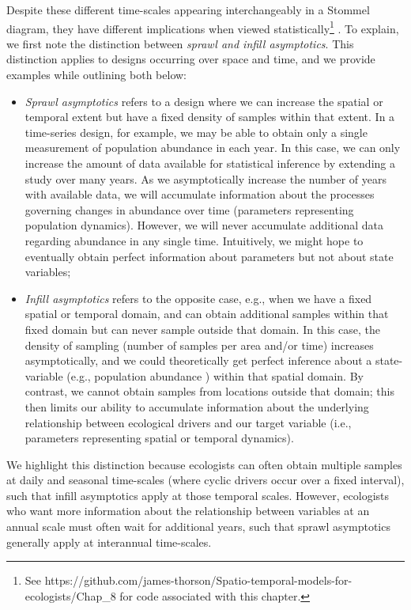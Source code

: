 Despite these different time-scales appearing interchangeably in a Stommel diagram, they have different implications when viewed statistically\footnote{See https://github.com/james-thorson/Spatio-temporal-models-for-ecologists/Chap\_8 for code associated with this chapter.} \cite{cressie_statistics_1993}.  To explain, we first note the distinction between \textit{sprawl and infill asymptotics}.  This distinction applies to designs occurring over space and time, and we provide examples while outlining both below:
\begin{itemize}
    \item \textit{Sprawl asymptotics} refers to a design where we can increase the spatial or temporal extent but have a fixed density of samples within that extent.  In a time-series design, for example, we may be able to obtain only a single measurement of population abundance in each year.  In this case, we can only increase the amount of data available for statistical inference by extending a study over many years.  As we asymptotically increase the number of years with available data, we will accumulate information about the processes governing changes in abundance over time (parameters representing population dynamics). However, we will never accumulate additional data regarding abundance in any single time.  Intuitively, we might hope to eventually obtain perfect information about parameters but not about state variables;  
    
    \item \textit{Infill asymptotics} refers to the opposite case, e.g., when we have a fixed spatial or temporal domain, and can obtain additional samples within that fixed domain but can never sample outside that domain.  In this case, the density of sampling (number of samples per area and/or time) increases asymptotically, and we could theoretically get perfect inference about a state-variable (e.g., population abundance ) within that spatial domain.  By contrast, we cannot obtain samples from locations outside that domain;  this then limits our ability to accumulate information about the underlying relationship between ecological drivers and our target variable (i.e., parameters representing spatial or temporal dynamics).
\end{itemize}
We highlight this distinction because ecologists can often obtain multiple samples at daily and seasonal time-scales (where cyclic drivers occur over a fixed interval), such that infill asymptotics apply at those temporal scales.  However, ecologists who want more information about the relationship between variables at an annual scale must often wait for additional years, such that sprawl asymptotics generally apply at interannual time-scales.  

